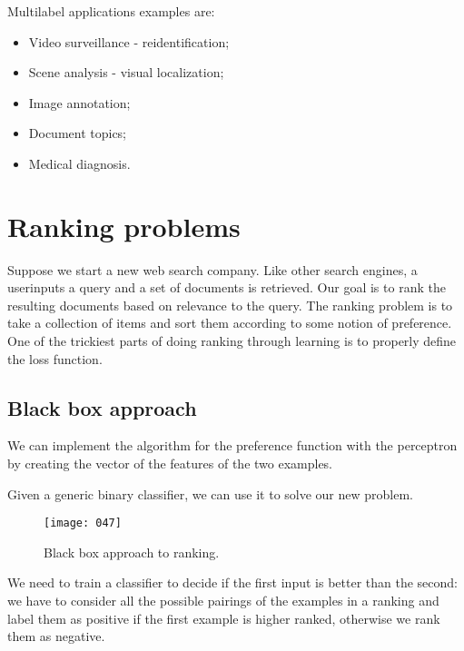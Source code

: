 Multilabel applications examples are:
\begin{itemize}[topsep={0pt}, partopsep={0pt}]
    \item Video surveillance - reidentification;
    \item Scene analysis - visual localization;
    \item Image annotation;
    \item Document topics;
    \item Medical diagnosis.
\end{itemize}

\section{Ranking problems}
Suppose we start a new web search company. Like other search engines, a userinputs a query and a set of documents is retrieved. Our goal is to rank the resulting documents based on relevance to the query. The ranking problem is to take a collection of items and sort them according to some notion of preference. One of the trickiest parts of doing ranking through learning is to properly define the loss function.

\subsection{Black box approach}
We can implement the algorithm for the preference function with the perceptron by creating the vector of the features of the two examples.

Given a generic binary classifier, we can use it to solve our new problem.
\begin{figure}[t!]
    \centering
    \texttt{[image: 047]}
    \caption{Black box approach to ranking.}
\end{figure}
We need to train a classifier to decide if the first input is better than the second: we have to consider all the possible pairings of the examples in a ranking and label them as positive if the first example is higher ranked, otherwise we rank them as negative.

